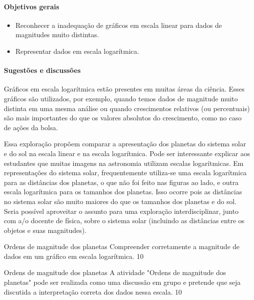 \def\currentcolor{session1}
\begin{texto}
{
\paragraph{Objetivos gerais}
\begin{itemize}
\item Reconhecer a inadequação de gráficos em escala linear para dados de magnitudes muito distintas.
\item Representar dados em escala logarítmica.
\end{itemize}
\paragraph{Sugestões e discussões}
Gráficos em escala logarítmica estão presentes em muitas áreas da ciência. Esses gráficos são utilizados, por exemplo, quando temos dados de magnitude muito distinta em uma mesma análise ou quando crescimentos relativos (ou percentuais) são mais importantes do que os valores absolutos do crescimento, como no caso de ações da bolsa. 

Essa exploração propõem comparar a apresentação dos planetas do sistema solar e do sol na escala linear e na escala logarítmica. Pode ser interessante explicar aos estudantes que muitas imagens na astronomia utilizam escalas logarítmicas. Em representações do sistema solar, frequentemente utiliza-se uma escala logarítmica para as distâncias dos planetas, o que não foi feito nas figuras ao lado, e outra escala logarítmica para os tamanhos dos planetas. Isso ocorre pois as distâncias no sistema solar são muito maiores do que os tamanhos dos planetas e do sol. Seria possível aproveitar o assunto para uma exploração interdisciplinar, junto com a/o docente de física, sobre o sistema solar (incluindo as distâncias entre os objetos e suas magnitudes).
}
\end{texto}
\clearmargin
\begin{objectives}{Ordens de magnitude dos planetas}
{
	Compreender corretamente a magnitude de dados em um gráfico em escala logarítmica.
}{1}{0}
\end{objectives}
\begin{sugestions}{Ordens de magnitude dos planetas}
{
	A atividade "Ordens de magnitude dos planetas" pode ser realizada como uma discussão em grupo e pretende que seja discutida a interpretação correta dos dados nessa escala.
}{1}{0}
\end{sugestions}
